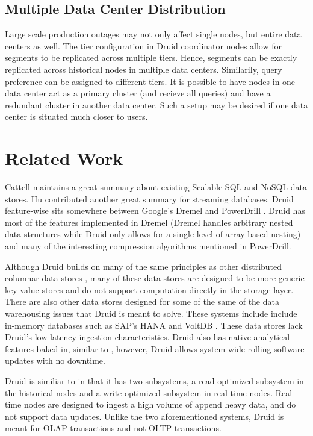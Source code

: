 \documentclass{acm_proc_article-sp}
\begin{document}
\subsection{Multiple Data Center Distribution}
Large scale production outages may not only affect single nodes, but entire
data centers as well. The tier configuration in Druid coordinator nodes allow
for segments to be replicated across multiple tiers. Hence, segments can be
exactly replicated across historical nodes in multiple data centers.
Similarily, query preference can be assigned to different tiers. It is possible
to have nodes in one data center act as a primary cluster (and recieve all
queries) and have a redundant cluster in another data center. Such a setup may
be desired if one data center is situated much closer to users. 

\section{Related Work}
\label{sec:related}
Cattell \cite{cattell2011scalable} maintains a great summary about existing
Scalable SQL and NoSQL data stores. Hu \cite{hu2011stream} contributed another
great summary for streaming databases.  Druid feature-wise sits somewhere
between Google’s Dremel \cite{melnik2010dremel} and PowerDrill
\cite{hall2012processing}. Druid has most of the features implemented in Dremel
(Dremel handles arbitrary nested data structures while Druid only allows for a
single level of array-based nesting) and many of the interesting compression
algorithms mentioned in PowerDrill.

Although Druid builds on many of the same principles as other distributed
columnar data stores \cite{fink2012distributed}, many of these data stores are
designed to be more generic key-value stores \cite{lakshman2010cassandra} and do not
support computation directly in the storage layer.  There are also other data
stores designed for some of the same of the data warehousing issues that Druid
is meant to solve. These systems include include in-memory databases such as
SAP’s HANA \cite{farber2012sap} and VoltDB \cite{voltdb2010voltdb}. These data
stores lack Druid's low latency ingestion characteristics. Druid also has
native analytical features baked in, similar to \cite{paraccel2013}, however,
Druid allows system wide rolling software updates with no downtime.  

Druid is similiar to \cite{stonebraker2005c, cipar2012lazybase} in that it has
two subsystems, a read-optimized subsystem in the historical nodes and a
write-optimized subsystem in real-time nodes. Real-time nodes are designed to
ingest a high volume of append heavy data, and do not support data updates.
Unlike the two aforementioned systems, Druid is meant for OLAP transactions and
not OLTP transactions.
\end{document}
